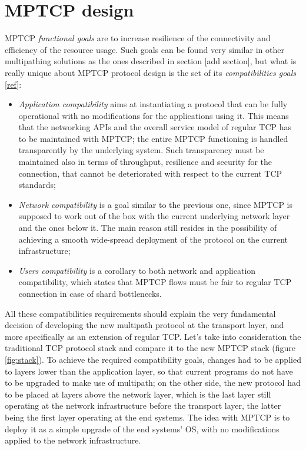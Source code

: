 \section{MPTCP design}
MPTCP \textit{functional goals} are to increase resilience of the connectivity and efficiency of the resource usage.
Such goals can be found very similar in other multipathing solutions as the ones described in section [add section], but what is really unique about MPTCP protocol design is the set of its \textit{compatibilities goals} [\href{https://tools.ietf.org/html/rfc6182}{ref}]:

\begin{itemize}
  \item \textit{Application compatibility} aims at instantiating a protocol that can be fully operational with no modifications for the applications using it. This means that the networking APIs and the overall service model of regular TCP has to be maintained with MPTCP; the entire MPTCP functioning is handled transparently by the underlying system. Such transparency must be maintained also in terms of throughput, resilience and security for the connection, that cannot be deteriorated with respect to the current TCP standards;
  \item \textit{Network compatibility} is a goal similar to the previous one, since MPTCP is supposed to work out of the box with the current underlying network layer and the ones below it. The main reason still resides in the possibility of achieving a smooth wide-spread deployment of the protocol on the current infrastructure;
  \item \textit{Users compatibility} is a corollary to both network and application compatibility, which states that MPTCP flows must be fair to regular TCP connection in case of shard bottlenecks.
\end{itemize}


All these compatibilities requirements should explain the very fundamental decision of developing the new multipath protocol at the transport layer, and more specifically as an extension of regular TCP. Let's take into consideration the traditional TCP protocol stack and compare it to the new MPTCP stack (figure \ref{fig:stack}).
To achieve the required compatibility goals, changes had to be applied to layers lower than the application layer, so that current programs do not have to be upgraded to make use of multipath; on the other side, the new protocol had to be placed at layers above the network layer, which is the last layer still operating at the network infrastructure before the transport layer, the latter being the first layer operating at the end systems. The idea with MPTCP is to deploy it as a simple upgrade of the end systems' OS, with no modifications applied to the network infrastructure.

